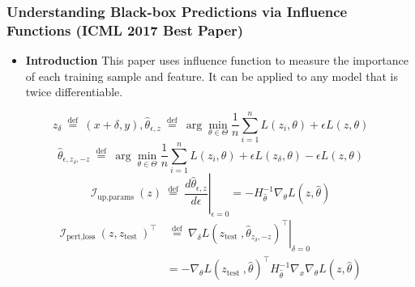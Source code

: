 \documentclass[11pt]{beamer}
\begin{document}
\begin{frame}
    \frametitle{Understanding Black-box Predictions via Influence Functions (ICML 2017 Best Paper)}
    \begin{itemize}
        \item \textbf{Introduction} This paper uses influence function to measure the importance of each training sample and feature. It can be applied to any model that is
              twice differentiable.
    \end{itemize}
    $$
        z_\delta \stackrel{\text { def }}{=}(x+\delta, y),
        \hat{\theta}_{\epsilon, z} \stackrel{\text { def }}{=} \arg \min _{\theta \in \Theta} \frac{1}{n} \sum_{i=1}^n L\left(z_i, \theta\right)+\epsilon L(z, \theta)
    $$
    $$
        \hat{\theta}_{\epsilon, z_\delta,-z} \stackrel{\text { def }}{=}\arg \min _{\theta \in \Theta} \frac{1}{n} \sum_{i=1}^n L\left(z_i, \theta\right)+\epsilon L\left(z_\delta, \theta\right)-\epsilon L(z, \theta)
    $$
    $$
        \left.\mathcal{I}_{\text {up,params }}(z) \stackrel{\text { def }}{=} \frac{d \hat{\theta}_{\epsilon, z}}{d \epsilon}\right|_{\epsilon=0}=-H_{\hat{\theta}}^{-1} \nabla_\theta L(z, \hat{\theta})
    $$
    $$
        \begin{aligned}
            \mathcal{I}_{\text {pert,loss }}\left(z, z_{\text {test }}\right)^{\top} & \left.\stackrel{\text { def }}{=} \nabla_\delta L\left(z_{\text {test }}, \hat{\theta}_{z_\delta,-z}\right)^{\top}\right|_{\delta=0} \\
                                                                                     & =-\nabla_\theta L\left(z_{\text {test }}, \hat{\theta}\right)^{\top} H_{\hat{\theta}}^{-1} \nabla_x \nabla_\theta L(z, \hat{\theta})
        \end{aligned}
    $$
\end{frame}
\end{document}
